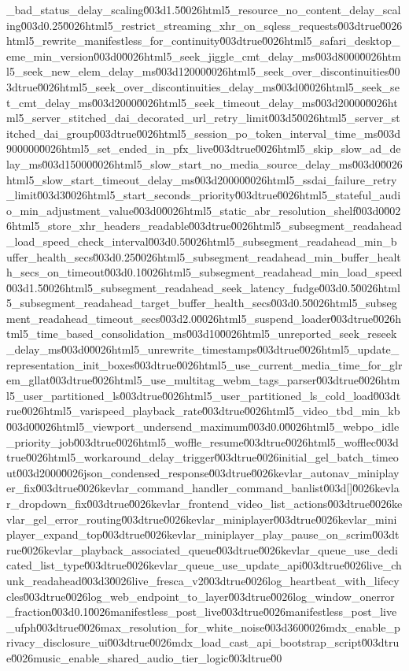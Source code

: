 {_bad_status_delay_scaling\u003d1.5\u0026html5_resource_no_content_delay_scaling\u003d0.25\u0026html5_restrict_streaming_xhr_on_sqless_requests\u003dtrue\u0026html5_rewrite_manifestless_for_continuity\u003dtrue\u0026html5_safari_desktop_eme_min_version\u003d0\u0026html5_seek_jiggle_cmt_delay_ms\u003d8000\u0026html5_seek_new_elem_delay_ms\u003d12000\u0026html5_seek_over_discontinuities\u003dtrue\u0026html5_seek_over_discontinuities_delay_ms\u003d0\u0026html5_seek_set_cmt_delay_ms\u003d2000\u0026html5_seek_timeout_delay_ms\u003d20000\u0026html5_server_stitched_dai_decorated_url_retry_limit\u003d5\u0026html5_server_stitched_dai_group\u003dtrue\u0026html5_session_po_token_interval_time_ms\u003d900000\u0026html5_set_ended_in_pfx_live\u003dtrue\u0026html5_skip_slow_ad_delay_ms\u003d15000\u0026html5_slow_start_no_media_source_delay_ms\u003d0\u0026html5_slow_start_timeout_delay_ms\u003d20000\u0026html5_ssdai_failure_retry_limit\u003d3\u0026html5_start_seconds_priority\u003dtrue\u0026html5_stateful_audio_min_adjustment_value\u003d0\u0026html5_static_abr_resolution_shelf\u003d0\u0026html5_store_xhr_headers_readable\u003dtrue\u0026html5_subsegment_readahead_load_speed_check_interval\u003d0.5\u0026html5_subsegment_readahead_min_buffer_health_secs\u003d0.25\u0026html5_subsegment_readahead_min_buffer_health_secs_on_timeout\u003d0.1\u0026html5_subsegment_readahead_min_load_speed\u003d1.5\u0026html5_subsegment_readahead_seek_latency_fudge\u003d0.5\u0026html5_subsegment_readahead_target_buffer_health_secs\u003d0.5\u0026html5_subsegment_readahead_timeout_secs\u003d2.0\u0026html5_suspend_loader\u003dtrue\u0026html5_time_based_consolidation_ms\u003d10\u0026html5_unreported_seek_reseek_delay_ms\u003d0\u0026html5_unrewrite_timestamps\u003dtrue\u0026html5_update_representation_init_boxes\u003dtrue\u0026html5_use_current_media_time_for_glrem_gllat\u003dtrue\u0026html5_use_multitag_webm_tags_parser\u003dtrue\u0026html5_user_partitioned_ls\u003dtrue\u0026html5_user_partitioned_ls_cold_load\u003dtrue\u0026html5_varispeed_playback_rate\u003dtrue\u0026html5_video_tbd_min_kb\u003d0\u0026html5_viewport_undersend_maximum\u003d0.0\u0026html5_webpo_idle_priority_job\u003dtrue\u0026html5_woffle_resume\u003dtrue\u0026html5_wofflec\u003dtrue\u0026html5_workaround_delay_trigger\u003dtrue\u0026initial_gel_batch_timeout\u003d2000\u0026json_condensed_response\u003dtrue\u0026kevlar_autonav_miniplayer_fix\u003dtrue\u0026kevlar_command_handler_command_banlist\u003d[]\u0026kevlar_dropdown_fix\u003dtrue\u0026kevlar_frontend_video_list_actions\u003dtrue\u0026kevlar_gel_error_routing\u003dtrue\u0026kevlar_miniplayer\u003dtrue\u0026kevlar_miniplayer_expand_top\u003dtrue\u0026kevlar_miniplayer_play_pause_on_scrim\u003dtrue\u0026kevlar_playback_associated_queue\u003dtrue\u0026kevlar_queue_use_dedicated_list_type\u003dtrue\u0026kevlar_queue_use_update_api\u003dtrue\u0026live_chunk_readahead\u003d3\u0026live_fresca_v2\u003dtrue\u0026log_heartbeat_with_lifecycles\u003dtrue\u0026log_web_endpoint_to_layer\u003dtrue\u0026log_window_onerror_fraction\u003d0.1\u0026manifestless_post_live\u003dtrue\u0026manifestless_post_live_ufph\u003dtrue\u0026max_resolution_for_white_noise\u003d360\u0026mdx_enable_privacy_disclosure_ui\u003dtrue\u0026mdx_load_cast_api_bootstrap_script\u003dtrue\u0026music_enable_shared_audio_tier_logic\u003dtrue\u00}
